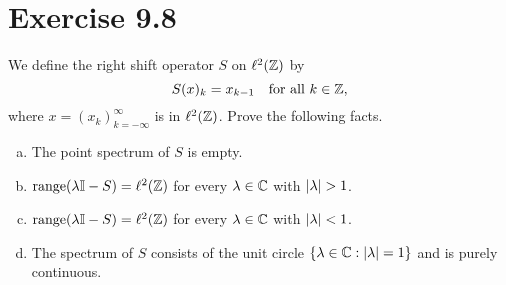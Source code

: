 \section{Exercise 9.8}
We define the right shift operator $S$ on $\ell^2(\mathbb{Z})$ by 
\[S(x)_k = x_{k-1} \quad \text{for all $k \in \mathbb{Z}$},\]
where $x = (x_k)_{k = -\infty}^\infty$ is in $\ell^2(\mathbb{Z})$. Prove the following facts.
\begin{enumerate}[a)]
    \item The point spectrum of $S$ is empty.
    \item $\text{range} (\mathrm{\lambda}\mathbb{I} - S) = \ell^2(\mathbb{Z})$ for every $\mathrm{\lambda} \in \mathbb{C}$ with $|\mathrm{\lambda}| > 1$.
    \item $\text{range} (\mathrm{\lambda}\mathbb{I} - S) = \ell^2(\mathbb{Z})$ for every $\mathrm{\lambda} \in \mathbb{C}$ with $|\mathrm{\lambda}| < 1$.
    \item The spectrum of $S$ consists of the unit circle $\{\mathrm{\lambda}\in\mathbb{C} : |\mathrm{\lambda}| = 1\}$ and is purely continuous.
\end{enumerate}
\partbreak
